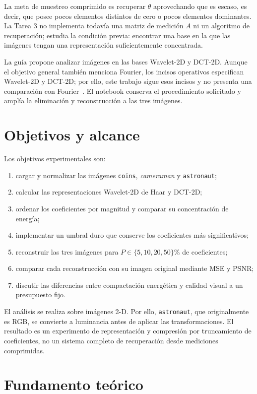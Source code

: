 \documentclass[11pt,a4paper]{article}
\begin{document}
La meta de muestreo comprimido es recuperar $\theta$ aprovechando que es escaso, es decir, que posee pocos elementos distintos de cero o pocos elementos dominantes. La Tarea 3 no implementa todavía una matriz de medición $A$ ni un algoritmo de recuperación; estudia la condición previa: encontrar una base en la que las imágenes tengan una representación suficientemente concentrada.

La guía propone analizar imágenes en las bases Wavelet-2D y DCT-2D. Aunque el objetivo general también menciona Fourier, los incisos operativos especifican Wavelet-2D y DCT-2D; por ello, este trabajo sigue esos incisos y no presenta una comparación con Fourier~\cite{assignment}. El notebook conserva el procedimiento solicitado y amplía la eliminación y reconstrucción a las tres imágenes.

\section{Objetivos y alcance}

Los objetivos experimentales son:
\begin{enumerate}[label=\arabic*.]
    \item cargar y normalizar las imágenes \texttt{coins}, \textit{cameraman} y \texttt{astronaut};
    \item calcular las representaciones Wavelet-2D de Haar y DCT-2D;
    \item ordenar los coeficientes por magnitud y comparar su concentración de energía;
    \item implementar un umbral duro que conserve los coeficientes más significativos;
    \item reconstruir las tres imágenes para $P\in\{5,10,20,50\}\%$ de coeficientes;
    \item comparar cada reconstrucción con su imagen original mediante MSE y PSNR;
    \item discutir las diferencias entre compactación energética y calidad visual a un presupuesto fijo.
\end{enumerate}

El análisis se realiza sobre imágenes 2-D. Por ello, \texttt{astronaut}, que originalmente es RGB, se convierte a luminancia antes de aplicar las transformaciones. El resultado es un experimento de representación y compresión por truncamiento de coeficientes, no un sistema completo de recuperación desde mediciones comprimidas.

\section{Fundamento teórico}
\end{document}
